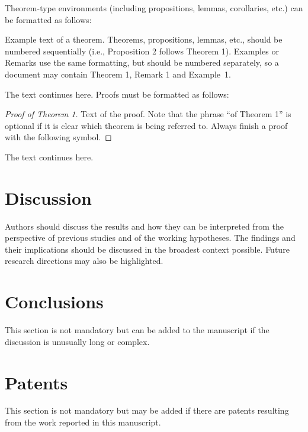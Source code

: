 \documentclass[geomatics,article,submit,moreauthors]{Definitions/mdpi}
\begin{document}
Theorem-type environments (including propositions, lemmas, corollaries, etc.) can be formatted as follows:
\begin{Theorem}
Example text of a theorem. Theorems, propositions, lemmas, etc., should be numbered sequentially (i.e., Proposition 2 follows Theorem 1). Examples or Remarks use the same formatting, but should be numbered separately, so a document may contain Theorem 1, Remark 1 and Example~1.
\end{Theorem}

The text continues here. Proofs must be formatted as follows:

\begin{proof}[Proof of Theorem 1]
Text of the proof. Note that the phrase ``of Theorem 1” is optional if it is clear which theorem is being referred to. Always finish a proof with the following symbol.
\end{proof}

The text continues here.

\section{Discussion}

Authors should discuss the results and how they can be interpreted from the perspective of previous studies and of the working hypotheses. The findings and their implications should be discussed in the broadest context possible. Future research directions may also be highlighted.

\section{Conclusions}

This section is not mandatory but can be added to the manuscript if the discussion is unusually long or complex.

\section{Patents}

This section is not mandatory but may be added if there are patents resulting from the work reported in this manuscript.

\vspace{6pt} 
\end{document}
